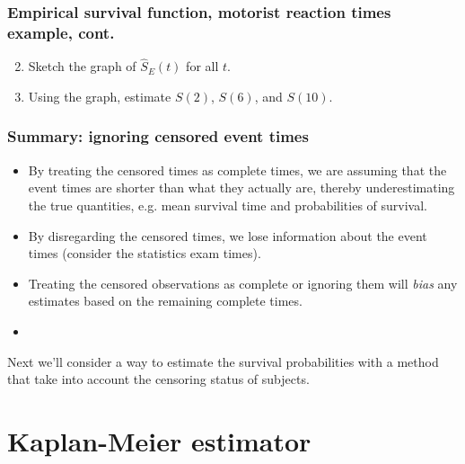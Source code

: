 \begin{frame}
\frametitle{Empirical survival function, motorist reaction times example, cont.}
\begin{enumerate}
\setcounter{enumi}{1}
\item Sketch the graph of $\widehat{S}_E(t)$ for all $t$.
\item Using the graph, estimate $S(2)$, $S(6)$, and $S(10)$.
\end{enumerate}
\vskip200pt
\end{frame}

\begin{frame}
\frametitle{Summary: ignoring censored event times}
\begin{itemize}
\item By treating the censored times as complete times, we are assuming that the event times are shorter than what they actually are, thereby underestimating the true quantities, e.g. mean survival time and
probabilities of survival.
\item By disregarding the censored times, we lose information about the event times (consider the statistics exam times).
\item Treating the censored observations as complete or ignoring them will \textit{bias} any estimates based on the remaining complete times.
\item[]
\end{itemize}
Next we'll consider a way to estimate the survival probabilities with a method that take into account the censoring status of
subjects.
\end{frame}

\section[KM estimator]{Kaplan-Meier estimator}
\subsection{}
\begin{frame}
\end{frame}

